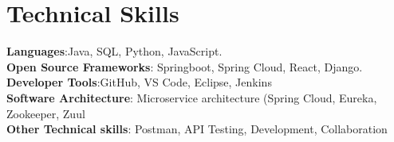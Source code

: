 \documentclass[letterpaper,8pt]{article}
\begin{document}
\section{Technical Skills}
 \begin{itemize}[leftmargin=0.15in, label={}]
    \small{\item{
    \textbf{Languages}{:Java, SQL, Python, JavaScript.} \\
    \textbf{Open Source Frameworks}{: Springboot, Spring Cloud, React, Django. } \\
     \textbf{Developer Tools}{:GitHub, VS Code, Eclipse, Jenkins} \\
     \textbf{Software Architecture}{: Microservice architecture (Spring Cloud, Eureka, Zookeeper, Zuul}\\
     \textbf{Other Technical skills}{: Postman, API Testing, Development, Collaboration}\\
    
     
     
     
     
    }}
 \end{itemize}
 


\end{document}
